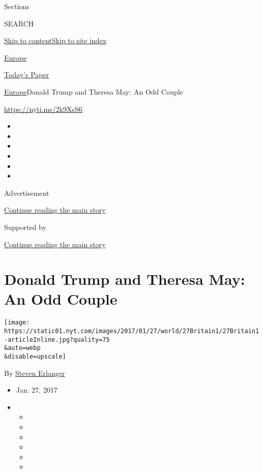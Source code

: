 Sections

SEARCH

\protect\hyperlink{site-content}{Skip to
content}\protect\hyperlink{site-index}{Skip to site index}

\href{https://www.nytimes.com/section/world/europe}{Europe}

\href{https://myaccount.nytimes.com/auth/login?response_type=cookie\&client_id=vi}{}

\href{https://www.nytimes.com/section/todayspaper}{Today's Paper}

\href{/section/world/europe}{Europe}\textbar{}Donald Trump and Theresa
May: An Odd Couple

\url{https://nyti.ms/2k9XsS6}

\begin{itemize}
\item
\item
\item
\item
\item
\item
\end{itemize}

Advertisement

\protect\hyperlink{after-top}{Continue reading the main story}

Supported by

\protect\hyperlink{after-sponsor}{Continue reading the main story}

\hypertarget{donald-trump-and-theresa-may-an-odd-couple}{%
\section{Donald Trump and Theresa May: An Odd
Couple}\label{donald-trump-and-theresa-may-an-odd-couple}}

\texttt{[image: https://static01.nyt.com/images/2017/01/27/world/27Britain1/27Britain1-articleInline.jpg?quality=75\\\&auto=webp\\\&disable=upscale]}

By \href{http://www.nytimes.com/by/steven-erlanger}{Steven Erlanger}

\begin{itemize}
\item
  Jan. 27, 2017
\item
  \begin{itemize}
  \item
  \item
  \item
  \item
  \item
  \item
  \end{itemize}
\end{itemize}

